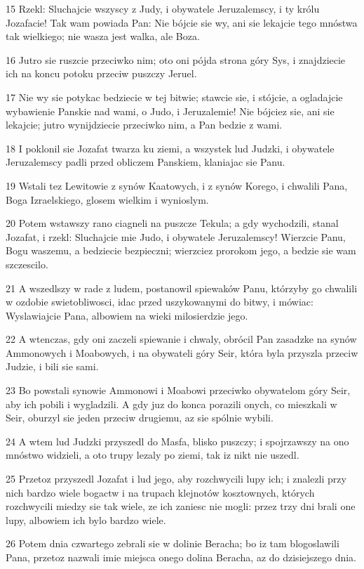 \par 15 Rzekl: Sluchajcie wszyscy z Judy, i obywatele Jeruzalemscy, i ty królu Jozafacie! Tak wam powiada Pan: Nie bójcie sie wy, ani sie lekajcie tego mnóstwa tak wielkiego; nie wasza jest walka, ale Boza.
\par 16 Jutro sie ruszcie przeciwko nim; oto oni pójda strona góry Sys, i znajdziecie ich na koncu potoku przeciw puszczy Jeruel.
\par 17 Nie wy sie potykac bedziecie w tej bitwie; stawcie sie, i stójcie, a ogladajcie wybawienie Panskie nad wami, o Judo, i Jeruzalemie! Nie bójciez sie, ani sie lekajcie; jutro wynijdziecie przeciwko nim, a Pan bedzie z wami.
\par 18 I poklonil sie Jozafat twarza ku ziemi, a wszystek lud Judzki, i obywatele Jeruzalemscy padli przed obliczem Panskiem, klaniajac sie Panu.
\par 19 Wstali tez Lewitowie z synów Kaatowych, i z synów Korego, i chwalili Pana, Boga Izraelskiego, glosem wielkim i wynioslym.
\par 20 Potem wstawszy rano ciagneli na puszcze Tekula; a gdy wychodzili, stanal Jozafat, i rzekl: Sluchajcie mie Judo, i obywatele Jeruzalemscy! Wierzcie Panu, Bogu waszemu, a bedziecie bezpieczni; wierzciez prorokom jego, a bedzie sie wam szczescilo.
\par 21 A wszedlszy w rade z ludem, postanowil spiewaków Panu, którzyby go chwalili w ozdobie swietobliwosci, idac przed uszykowanymi do bitwy, i mówiac: Wyslawiajcie Pana, albowiem na wieki milosierdzie jego.
\par 22 A wtenczas, gdy oni zaczeli spiewanie i chwaly, obrócil Pan zasadzke na synów Ammonowych i Moabowych, i na obywateli góry Seir, która byla przyszla przeciw Judzie, i bili sie sami.
\par 23 Bo powstali synowie Ammonowi i Moabowi przeciwko obywatelom góry Seir, aby ich pobili i wygladzili. A gdy juz do konca porazili onych, co mieszkali w Seir, oburzyl sie jeden przeciw drugiemu, az sie spólnie wybili.
\par 24 A wtem lud Judzki przyszedl do Masfa, blisko puszczy; i spojrzawszy na ono mnóstwo widzieli, a oto trupy lezaly po ziemi, tak iz nikt nie uszedl.
\par 25 Przetoz przyszedl Jozafat i lud jego, aby rozchwycili lupy ich; i znalezli przy nich bardzo wiele bogactw i na trupach klejnotów kosztownych, których rozchwycili miedzy sie tak wiele, ze ich zaniesc nie mogli: przez trzy dni brali one lupy, albowiem ich bylo bardzo wiele.
\par 26 Potem dnia czwartego zebrali sie w dolinie Beracha; bo iz tam blogoslawili Pana, przetoz nazwali imie miejsca onego dolina Beracha, az do dzisiejszego dnia.
